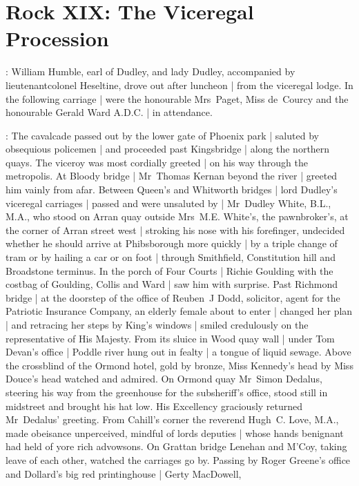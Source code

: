 \bigskip
\section*{Rock XIX: The Viceregal Procession}


:
William Humble,
earl of Dudley,
and lady Dudley,
accompanied by lieutenant\-colonel Heseltine,
drove out after luncheon |
from the viceregal lodge.
In the following carriage |
were the honourable Mrs~Paget,
Miss de~Courcy
and the honourable Gerald Ward A.D.C. |
in attendance.

:
The cavalcade passed out by the lower gate of Phoenix park |
saluted by obsequious policemen |
and proceeded past Kingsbridge |
along the northern quays.
The viceroy was most cordially greeted |
on his way through the metropolis.
At Bloody bridge |
Mr~Thomas Kernan beyond the river |
greeted him vainly from afar.
Between Queen's and Whitworth bridges |
lord Dudley's viceregal carriages |
passed and were unsaluted by |
Mr~Dudley White, B.L., M.A.,
who stood on Arran quay outside Mrs~M.E. White's,
the pawnbroker's,
at the corner of Arran street west |
stroking his nose with his forefinger,
undecided whether he should arrive at Phibsborough more quickly |
by a triple change of tram
or by hailing a car
or on foot |
through Smithfield, Constitution hill and Broadstone terminus.%
In the porch of Four Courts |
Richie Goulding
with the costbag of Goulding, Collis and Ward |
saw him with surprise.
Past Richmond bridge |
at the doorstep
of the office of Reuben~J Dodd, solicitor,
agent for the Patriotic Insurance Company,
an elderly female about to enter |
changed her plan |
and retracing her steps by King's windows |
smiled credulously
on the representative of His Majesty.
From its sluice in Wood quay wall |
under Tom Devan's office |
Poddle river hung out in fealty |
a tongue of liquid sewage.
Above the crossblind of the Ormond hotel,
gold by bronze,
Miss Kennedy's head by Miss Douce's head
watched and admired.
On Ormond quay
Mr~Simon Dedalus,
steering his way from the greenhouse for the subsheriff's office,%
stood still in midstreet
and brought his hat low.
His Excellency graciously returned Mr~Dedalus' greeting.
From Cahill's corner
the reverend Hugh~C. Love, M.A.,
made obeisance
unperceived,
mindful of lords deputies |
whose hands benignant
had held of yore rich advowsons.
On Grattan bridge
Lenehan and M'Coy,
taking leave of each other,
watched the carriages go by.
Passing by Roger Greene's office
and Dollard's big red printinghouse |
Gerty MacDowell,
